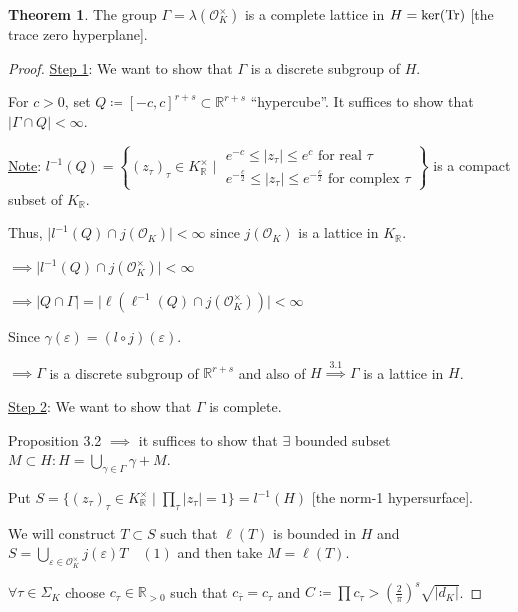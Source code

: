 \documentclass[openany]{amsbook}
\numberwithin{section}{chapter}
\theoremstyle{definition}
\newtheorem{theorem}{Theorem}[chapter]
\begin{document}
\begin{theorem}
    The group \(\Gamma = \lambda(\mathcal{O}_K^\times)\) is a complete lattice in \(H = \ker(\Tr)\) [the trace zero hyperplane].
\end{theorem}

\begin{proof}
    \underline{Step 1}: We want to show that \(\Gamma\) is a discrete subgroup of \(H\).

    For \(c > 0\), set \(Q \coloneqq [-c,c]^{r+s} \subset \mathbb{R}^{r+s}\) ``hypercube''. It suffices to show that \(\vert \Gamma \cap Q \vert < \infty \).

    \underline{Note}: \(l ^{-1} (Q) = \left\{ (z_{\tau})_{\tau} \in K_\mathbb{R}^\times \mid \substack{e^{-c} \leq \vert z_{\tau} \vert \leq e^c \text{ for real } \tau \\ e^{-\frac{c}{2}} \leq \vert z_{\tau} \vert \leq e^{-\frac{c}{2}} \text{ for complex } \tau } \right\} \) is a compact subset of \(K_\mathbb{R}\).

    Thus, \(\vert l ^{-1} (Q) \cap j(\mathcal{O}_K) \vert < \infty \) since \(j(\mathcal{O}_K)\) is a lattice in \(K_\mathbb{R}\).

    \(\implies \vert l^{-1} (Q) \cap j(\mathcal{O}_K^\times) \vert < \infty\) 

    \(\implies \vert Q\cap \Gamma \vert = \vert \ell(\ell ^{-1} (Q)\cap j(\mathcal{O}_K^\times)) \vert < \infty\) 

    Since \(\gamma (\varepsilon) = (l \circ j)(\varepsilon)\).

    \(\implies \Gamma\) is a discrete subgroup of \(\mathbb{R} ^{r+s}\) and also of \(H\overset{3.1}{\implies} \Gamma\) is a lattice in \(H\).

    \underline{Step 2}: We want to show that \(\Gamma\) is complete.

    Proposition 3.2 \(\implies\) it suffices to show that \(\exists\) bounded subset \(M \subset H : H= \bigcup_{\gamma \in \Gamma}^{} \gamma + M\).

    Put \(S = \{ (z_{\tau})_{\tau} \in K_\mathbb{R}^\times \mid \prod _\tau \vert z_{\tau}  \vert =1 \} = l ^{-1} (H) \) [the norm-1 hypersurface]. 

    We will construct \(T \subset S\) such that \(\ell(T)\) is bounded in \(H\) and \(\boxed{S = \bigcup_{\varepsilon \in \mathcal{O}_K^\times}^{} j(\varepsilon)T \quad (1)}\) and then take \(M = \ell(T)\).

    \(\forall \tau \in \Sigma_K\) choose \(c_{\tau} \in \mathbb{R}_{>0}\) such that \(c_{\overline{\tau }} = c_{\tau}\) and  \(C \coloneqq \prod c_{\tau} > \left( \frac{2}{\pi} \right) ^s \sqrt{\vert d_K \vert } \).


\end{proof}
\end{document}

